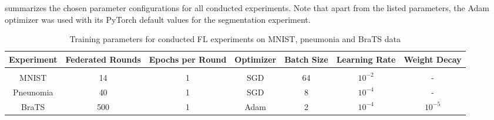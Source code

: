  summarizes the chosen parameter configurations for all conducted experiments.
Note that apart from the listed parameters, the Adam optimizer was used with its PyTorch default values for the segmentation experiment.

\begin{table}[htbp]
\begin{adjustbox}{width=1.0\textwidth}
  \centering
  \begin{tabular}{ccccccc}
  Experiment & Federated Rounds & Epochs per Round & Optimizer & Batch Size & Learning Rate & Weight Decay \\
  \hline \\[-2.5ex] %
  MNIST     & 14    & 1 & SGD   & 64 & $10^{-2}$ & - \\
  Pneunomia & 40    & 1 & SGD   & 8  & $10^{-4}$ & - \\
  BraTS     & 500   & 1 & Adam  & 2  & $10^{-4}$ & $10^{-5}$ \\
 \end{tabular}
 \end{adjustbox}
 \caption[Training parameters for conducted FL experiments]{Training parameters for conducted FL experiments on MNIST, pneumonia and BraTS data}
 \label{tab:TrainingParameters}
\end{table}
